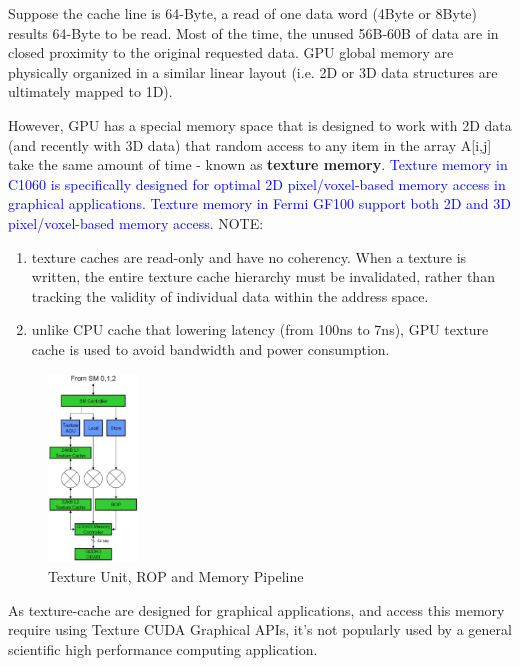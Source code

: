 Suppose the cache line is 64-Byte, a
read of one data word (4Byte or 8Byte) results 64-Byte to be read. Most of the
time, the unused 56B-60B of data are in closed proximity to the original
requested data. GPU global memory are physically organized in a similar linear
layout (i.e. 2D or 3D data structures are ultimately mapped to 1D).

However, GPU has a special memory space that is designed to work with 2D data
(and recently with 3D data) that random access to any item in the array A[i,j]
take the same amount of time - known as {\bf texture memory}.
\textcolor{blue}{Texture memory in C1060 is specifically designed for optimal 2D
pixel/voxel-based memory access in graphical applications. Texture memory in
Fermi GF100 support both 2D and 3D pixel/voxel-based memory access}. NOTE:

\begin{enumerate}
  \item  texture caches are read-only and have no coherency. When a texture is written,
the entire texture cache hierarchy must be invalidated, rather than tracking the
validity of individual data within the address space. 
  \item unlike CPU cache that lowering latency (from 100ns to 7ns), GPU texture
  cache is used to avoid bandwidth and power consumption. 
\end{enumerate}

\begin{figure}[hbt]
  \centerline{\includegraphics[height=5cm,
    angle=0]{./images/GT200_texture.eps}}
  \caption{Texture Unit, ROP and Memory Pipeline}
  \label{fig:GT200_texture}
\end{figure}


As texture-cache are designed for graphical applications, and access this memory
require using Texture CUDA Graphical APIs, it's not popularly used by a
general scientific high performance computing application.

